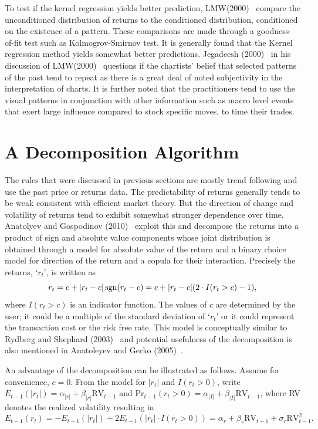 To test if the kernel regression yields better prediction, LMW(2000)~\cite{LoMWang} compare the unconditioned distribution of returns to the conditioned distribution, conditioned on the existence of a pattern. These comparisons are made through a goodness-of-fit test such as Kolmogrov-Smirnov test. It  is generally found that the Kernel regression method yields somewhat better predictions. Jegadeesh (2000)~\cite{Jeqa} in his discussion of LMW(2000)~\cite{LoMWang} questions if the chartists' belief that selected patterns of the past tend to repeat as there is a great deal of noted subjectivity in the interpretation of charts. It is further noted that the practitioners tend to use the visual patterns in conjunction with other information such as macro level events that exert large influence compared to stock specific moves, to time their trades.



\section{A Decomposition Algorithm \label{s:decomp_alg}}


The rules that were discussed in previous sections are mostly trend following and use the past price or returns data. The predictability of returns generally tends to be weak consistent with efficient market theory. But the direction of change and volatility of returns tend to exhibit somewhat stronger dependence over time. Anatolyev and Gospodinov (2010)~\cite{Ananto2} exploit this and decompose the returns into a product of sign and absolute value components whose joint distribution is obtained through a model for absolute value of the return and a binary choice model for direction of the return and a copula for their interaction. Precisely the returns, `$r_{t}$', is written as
	\begin{equation} \label{eqn:3sgn}
	r_t = c + \lvert r_t - c\rvert \sgn (r_t - c)= c + \lvert r_t - c \rvert (2\cdot I(r_t  > c) - 1),
	\end{equation}
where $I(r_t > c)$ is an indicator function. The values of $c$ are determined by the user; it could be a multiple of the standard deviation of `$r_{t}$' or it could represent the transaction cost or the risk free rate. This model is conceptually similar to Rydberg and Shephard (2003)~\cite{Ryd} and potential usefulness of the decomposition is also mentioned in Anatoleyev and Gerko (2005)~\cite{Ananto1}.


An advantage of the decomposition can be illustrated as follows. Assume for convenience, $c = 0$. From the model for $|r_t|$ and $I(r_t > 0)$, write $E_{t-1}(\left|r_{t}\right|) = \alpha_{\left|r\right|} + \beta_{\left| r \right|}\text{RV}_{t-1}$ and $\text{Pr}_{t-1}(r_t >0) = \alpha_{\left| I \right|} + \beta_{\left| I \right|}\text{RV}_{t-1}$, where RV denotes the realized volatility resulting in 
	\[
	E_{t-1}(r_t)= -E_{t-1}(\left| r_t \right|) + 2E_{t-1}(\left| r_{t} \right| \cdot I(r_{t} > 0))= \alpha_{r} + \beta_{r} \text{RV}_{t-1} + \sigma_{r} \text{RV}_{t-1}^2.
	\]


